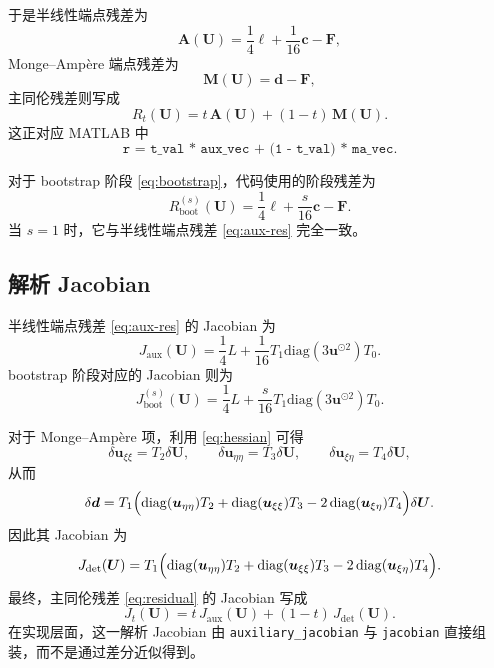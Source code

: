 \documentclass[11pt,a4paper]{article}
\begin{document}
于是半线性端点残差为
\begin{equation}
\bm A(\bm U)=\frac14\bm\ell+\frac1{16}\bm c-\bm F,
\label{eq:aux-res}
\end{equation}
Monge--Amp\`ere 端点残差为
\begin{equation}
\bm M(\bm U)=\bm d-\bm F,
\label{eq:ma-res}
\end{equation}
主同伦残差则写成
\begin{equation}
R_t(\bm U)=t\,\bm A(\bm U)+(1-t)\,\bm M(\bm U).
\label{eq:residual}
\end{equation}
这正对应 MATLAB 中
\[
\texttt{r = t\_val * aux\_vec + (1 - t\_val) * ma\_vec.}
\]

对于 bootstrap 阶段 \eqref{eq:bootstrap}，代码使用的阶段残差为
\begin{equation}
R^{(s)}_{\mathrm{boot}}(\bm U)=\frac14\bm\ell+\frac{s}{16}\bm c-\bm F.
\label{eq:boot-res}
\end{equation}
当 $s=1$ 时，它与半线性端点残差 \eqref{eq:aux-res} 完全一致。

\subsection{解析 Jacobian}
半线性端点残差 \eqref{eq:aux-res} 的 Jacobian 为
\begin{equation}
J_{\mathrm{aux}}(\bm U)
=
\frac14L+\frac1{16}T_1\mathrm{diag}(3\bm u^{\odot 2})T_0.
\label{eq:Jaux}
\end{equation}
bootstrap 阶段对应的 Jacobian 则为
\begin{equation}
J^{(s)}_{\mathrm{boot}}(\bm U)
=
\frac14L+\frac{s}{16}T_1\mathrm{diag}(3\bm u^{\odot 2})T_0.
\label{eq:Jboot}
\end{equation}

对于 Monge--Amp\`ere 项，利用 \eqref{eq:hessian} 可得
\[
\delta \bm u_{\xi\xi}=T_2\delta\bm U,\qquad
\delta \bm u_{\eta\eta}=T_3\delta\bm U,\qquad
\delta \bm u_{\xi\eta}=T_4\delta\bm U,
\]
从而
\begin{equation}
\delta \bm d
=
T_1\Bigl(
\mathrm{diag}(\bm u_{\eta\eta})T_2
+\mathrm{diag}(\bm u_{\xi\xi})T_3
-2\,\mathrm{diag}(\bm u_{\xi\eta})T_4
\Bigr)\delta\bm U.
\label{eq:det-var}
\end{equation}
因此其 Jacobian 为
\begin{equation}
J_{\det}(\bm U)
=
T_1\Bigl(
\mathrm{diag}(\bm u_{\eta\eta})T_2
+\mathrm{diag}(\bm u_{\xi\xi})T_3
-2\,\mathrm{diag}(\bm u_{\xi\eta})T_4
\Bigr).
\label{eq:Jdet}
\end{equation}
最终，主同伦残差 \eqref{eq:residual} 的 Jacobian 写成
\begin{equation}
J_t(\bm U)=t\,J_{\mathrm{aux}}(\bm U)+(1-t)\,J_{\det}(\bm U).
\label{eq:Jt}
\end{equation}
在实现层面，这一解析 Jacobian 由 \texttt{auxiliary\_jacobian} 与 \texttt{jacobian} 直接组装，而不是通过差分近似得到。
\end{document}
